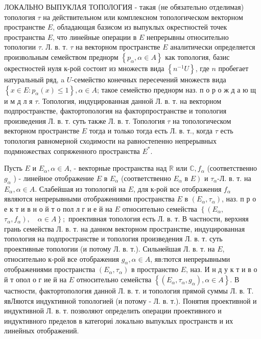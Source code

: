 \documentclass[10pt]{article}
\begin{document}
ЛОКАЛЬНО ВЫПУКЛАЯ ТОПОЛОГИЯ - такая (не обязательно отделимая) топология $\tau$ на действительном или комплексном топологическом векторном пространстве $E$, обладающая базисом из выпуклых окрестностей точек пространства $E$, что линейные операции в $E$ непрерывны относительно топологии $\tau$. Л. в. т. $\tau$ на векторном пространстве $E$ аналитически определяется произвольным семейством преднорм $\left\{p_{\alpha}, \alpha \in A\right\}$ как топология, базис окрестностей нуля к-рой состоит из множеств вида $\left\{n^{-1} U\right\}$, где $n$ пробегает натуральный ряд, a $U$-семейство конечных пересечений множеств вида $\left\{x \in E: p_{\alpha}(x) \leqslant 1\right\}, \alpha \in A$; такое семейство преднорм наз. п о р о ж д а ю щ и м д л я $\tau$. Топология, индуцированная данной Л. в. т. на векторном подпространстве, фактортопология на факторпространстве и топология произведения Л. в. т. суть также Л. в. т. Топология $\tau$ на топологическом векторном пространстве $E$ тогда и только тогда есть Л. в. т., когда $\tau$ есть топология равномерной сходимости на равностепенно непрерывных подмножествах сопряженного пространства $E^{*}$.



Пусть $E$ и $E_{\alpha}, \alpha \in A$, - векторные пространства над $\mathbb{R}$ или $\mathbb{C}, f_{\alpha}$ (соответственно $g_{\alpha}$ ) - линейное отображение $E$ в $E_{\alpha}$ (соответственно $E_{\alpha}$ в $\left.E\right)$ и $\tau_{\alpha}$-Л. в. т. на $E_{\alpha}, \alpha \in A$. Слабейшая из топологий на $E$, для к-рой все отображения $f_{\alpha}$ являются непрерывными отображениями пространства $E$ в $\left(E_{\alpha}, \tau_{\alpha}\right)$, наз. п р о е к т и в н о й т о пол л г и е й на $E$ относительно семейства $\left\{\left(E_{\alpha}\right.\right.$, $\left.\left.\tau_{\alpha}, f_{\alpha}\right), \quad \alpha \in A\right\} ;$ проективная топология есть Л. в. т. В частности, верхняя грань семейства Л. в. т. на данном векторном пространстве, индуцированная топология на подпространстве и топология произведения Л. в. т. суть проективные топологии (и потому Л. в. т.). Сильнейшая Л. в. т. на $E$, относительно к-рой все отображения $g_{\alpha}, \alpha \in A$, яв:тются непрерывными отображениями пространства $\left(E_{\alpha}, \tau_{\alpha}\right)$ в пространство $E$, наз. И н д у к т и в о й т опол о г ие й на $E$ относительно семейства $\left\{\left(E_{\alpha}, \tau_{\alpha}, g_{\alpha}\right), \alpha \in A\right\}$. В частности, фактортопология данной Л. в. т. и топология прямой суммы Л. в. Т. явЛяются индуктивной топологией (и потому - Л. в. т.). Понятия проективной и индуктивной Л. в. т. позволяют определить операции проективного и индуктивного пределов в категориі локально выпуклых пространств и их линейных отображений.
\end{document}
